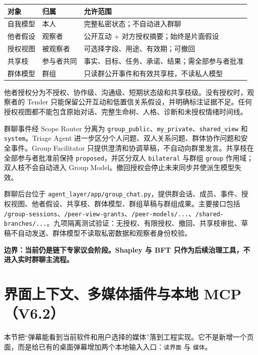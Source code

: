 \documentclass[UTF8,a4paper,11pt]{ctexart}
\newcommand{\warn}[1]{\textcolor{red!70!black}{\textbf{#1}}}
\begin{document}
\begin{center}
\begin{longtable}{@{}p{3.1cm}p{4.5cm}p{5.4cm}@{}}
\toprule
\textbf{对象} & \textbf{归属} & \textbf{允许范围} \\
\midrule
自我模型 & 本人 & 完整私密状态；不自动进入群聊 \\
他者假设 & 观察者 & 公开互动 + 对方授权摘要；始终是片面假设 \\
授权视图 & 被观察者 & 可选择字段、用途、有效期；可撤回 \\
共享枝 & 参与者共同 & 事实、目标、任务、承诺、结果；需全部参与者批准 \\
群体模型 & 群组 & 只读群公开事件和有效共享枝，不读私人模型 \\
\bottomrule
\end{longtable}
\end{center}

他者授权分为不授权、协作级、沟通级、短期状态级和共享枝级。没有授权时，观察者的 Tender 只能保留公开互动和低置信关系假设，并明确标注证据不足。任何授权视图都不能包含原始对话、完整生命树、人格、诊断和未授权情绪时间线。

群聊事件经 Scope Router 分离为 \texttt{group\_public}、\texttt{my\_private}、\texttt{shared\_view} 和 \texttt{system}。Triage Agent 进一步区分个人问题、双人关系问题、群体协作问题和安全事件。Group Facilitator 只提供澄清和协调草稿，不自动向群里发言。共享枝在全部参与者批准前保持 \texttt{proposed}，并区分双人 \texttt{bilateral} 与群组 \texttt{group} 作用域；双人枝不会自动进入 Group Model。撤回授权会停止未来同步并使派生模型失效。

群聊后台位于 \texttt{agent\_layer/app/group\_chat.py}，提供群会话、成员、事件、授权视图、他者假设、共享枝、群体模型、群组草稿与群组成果。主要接口包括 \texttt{/group-sessions}、\texttt{/peer-view-grants}、\texttt{/peer-models/...}、\texttt{/shared-branches/...}。九项隔离测试验证：无授权、有限授权、撤回、共享枝审批、草稿不自动发送、群体模型不读取私密数据和观察者身份校验。

\warn{边界：当前仍是链下专家议会阶段。Shapley 与 BFT 只作为后续治理工具，不进入实时群聊主流程。}

\section{界面上下文、多媒体插件与本地 MCP（V6.2）}

本节把“弹幕能看到当前软件和用户选择的媒体”落到工程实现。它不是新增一个页面，而是给已有的桌面弹幕增加两个本地输入入口：\texttt{读界面} 与 \texttt{媒体}。
\end{document}
